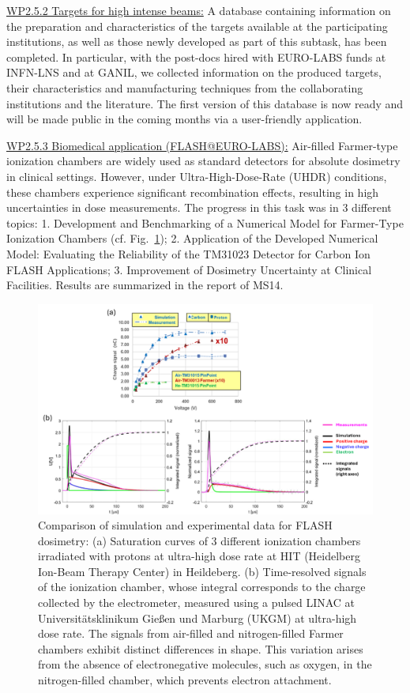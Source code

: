 \underline{WP2.5.2 Targets for high intense beams:} A database containing information on the preparation and characteristics of the targets available at the participating institutions, as well as those newly developed as part of this subtask, has been completed. In particular, with the post-docs hired with EURO-LABS funds at INFN-LNS and at GANIL, we collected information on the produced targets, their characteristics and manufacturing techniques from the collaborating institutions and the literature. The first version of this database is now ready and will be made public in the coming months via a user-friendly application.

\underline{WP2.5.3 Biomedical application (FLASH@EURO-LABS):} Air-filled Farmer-type ionization chambers are widely used as standard detectors for absolute dosimetry in clinical settings. However, under Ultra-High-Dose-Rate (UHDR) conditions, these chambers experience significant recombination effects, resulting in high uncertainties in dose measurements.
The progress in this task was in 3 different topics: 1. Development and Benchmarking of a Numerical Model for Farmer-Type Ionization Chambers (cf. Fig.~\ref{fig:FLASH1}); 2. Application of the Developed Numerical Model: Evaluating the Reliability of the TM31023 Detector for Carbon Ion FLASH Applications; 3. Improvement of Dosimetry Uncertainty at Clinical Facilities. Results are summarized in the report of MS14.


\begin{figure}[!h]
    \centering
    \includegraphics[width=1.0\linewidth]{graphics/FLASH1.png}
    \caption{Comparison of simulation and experimental data for FLASH dosimetry:
(a) Saturation curves of 3 different ionization chambers irradiated with protons at ultra-high dose rate at HIT (Heidelberg Ion-Beam Therapy Center) in Heildeberg. (b) Time-resolved signals of the ionization chamber, whose integral corresponds to the charge collected by the electrometer, measured using a pulsed LINAC at Universitätsklinikum Gießen und Marburg (UKGM) at ultra-high dose rate. The signals from air-filled and nitrogen-filled Farmer chambers exhibit distinct differences in shape. This variation arises from the absence of electronegative molecules, such as oxygen, in the nitrogen-filled chamber, which prevents electron attachment.
}
    \label{fig:FLASH1}
\end{figure}

